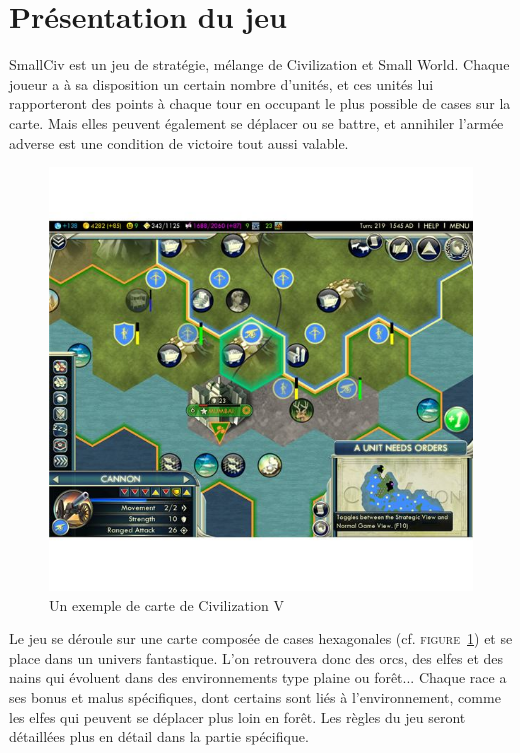 \section{Présentation du jeu}

SmallCiv est un jeu de stratégie, mélange de Civilization et Small World. Chaque joueur a à sa disposition un certain nombre d'unités, et ces unités lui rapporteront des points à chaque tour en occupant le plus possible de cases sur la carte. Mais elles peuvent également se déplacer ou se battre, et annihiler l'armée adverse est une condition de victoire tout aussi valable. \newline

\begin{figure}
	\centering
	\includegraphics[scale=0.5]{img/map.jpg}
	\caption{Un exemple de carte de Civilization V}
	\label{map}
\end{figure}
Le jeu se déroule sur une carte composée de cases hexagonales (cf. \textsc{figure~\ref{map}}) et se place dans un univers fantastique. L'on retrouvera donc des orcs, des elfes et des nains qui évoluent dans des environnements type plaine ou forêt... Chaque race a ses bonus et malus spécifiques, dont certains sont liés à l'environnement, comme les elfes qui  peuvent se déplacer plus loin en forêt. Les règles du jeu seront détaillées plus en détail dans la partie spécifique. 
